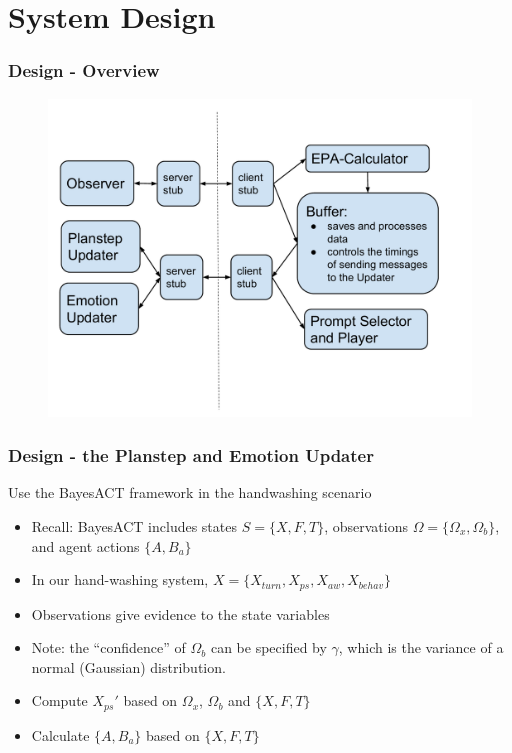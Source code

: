 \documentclass{beamer}
\begin{document}
\section{System Design}

\begin{frame}
\frametitle{Design - Overview}
\begin{figure}
\centering
\includegraphics[trim = 5mm 15mm 5mm 20mm, clip, width=.8\linewidth]{fig/fig-system-overview.pdf}
\end{figure}
\end{frame}

\begin{frame}
\frametitle{Design - the Planstep and Emotion Updater}
Use the BayesACT framework in the handwashing scenario
\begin{itemize}
\item Recall: BayesACT includes states $S = \{X, F, T\}$, observations $\Omega = \{\Omega_{x}, \Omega_{b}\}$, and agent actions $\{A, B_{a}\}$
\pause \item In our hand-washing system, $X = \{X_{turn}, X_{ps}, X_{aw}, X_{behav}\}$
\pause \item Observations give evidence to the state variables
\item Note: the ``confidence'' of $\Omega_b$ can be specified by $\gamma$, which is the variance of a normal (Gaussian) distribution.
\pause \item Compute $X_{ps}'$ based on $\Omega_{x}$, $\Omega_{b}$ and $\{X, F, T\}$
\pause \item Calculate $\{A, B_{a}\}$ based on $\{X, F, T\}$
\end{itemize}
\end{frame}
\end{document}
